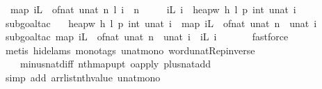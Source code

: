 \begin{isabellebody}
\ \ {\isacharparenleft}map\ {\isacharparenleft}iL\ {\isasymcirc}\ of{\isacharunderscore}nat{\isacharparenright}\ {\isacharbrackleft}{}{\isachardot}{\isachardot}{\isacharless}unat\ n{\isacharbrackright}{\isacharparenright}\ l{\isacharsemicolon}\ i\ {\isacharless}\ n{\isasymrbrakk}\ {\isasymLongrightarrow}\isanewline
\ \ \ \ iL\ i\ {\isacharequal}\ heap{\isacharunderscore}w{}{}\ h\ {\isacharparenleft}l\ {\isacharplus}\isactrlsub p\ int\ {\isacharparenleft}unat\ i{\isacharparenright}{\isacharparenright}{\isachardoublequoteclose}\ \isanewline
%
\isadelimproof
\ \ %
\endisadelimproof
%
\isatagproof
{}\isamarkupfalse%
\ {\isacharparenleft}subgoal{\isacharunderscore}tac\ \isanewline
\ \ {\isachardoublequoteopen}heap{\isacharunderscore}w{}{}\ h\ {\isacharparenleft}l\ {\isacharplus}\isactrlsub p\ int\ {\isacharparenleft}unat\ i{\isacharparenright}{\isacharparenright}\ {\isacharequal}\ map\ {\isacharparenleft}iL\ {\isasymcirc}\ of{\isacharunderscore}nat{\isacharparenright}\ {\isacharbrackleft}{}{\isachardot}{\isachardot}{\isacharless}unat\ n{\isacharbrackright}\ {\isacharbang}\ unat\ i{\isachardoublequoteclose}{\isacharparenright}\ \isanewline
\ \ \ \isamarkupfalse%
\ {\isacharparenleft}subgoal{\isacharunderscore}tac\ {\isachardoublequoteopen}map\ {\isacharparenleft}iL\ {\isasymcirc}\ of{\isacharunderscore}nat{\isacharparenright}\ {\isacharbrackleft}{}{\isachardot}{\isachardot}{\isacharless}unat\ n{\isacharbrackright}\ {\isacharbang}\ unat\ i\ {\isacharequal}\ iL\ i{\isachardoublequoteclose}{\isacharparenright}\ \isanewline
\ \ \ \ \isamarkupfalse%
\ fastforce\isanewline
\ \ \ \isamarkupfalse%
\ {\isacharparenleft}metis\ {\isacharparenleft}hide{\isacharunderscore}lams{\isacharcomma}\ mono{\isacharunderscore}tags{\isacharparenright}\ unat{\isacharunderscore}mono\ word{\isacharunderscore}unat{\isachardot}Rep{\isacharunderscore}inverse\ \isanewline
\ \ \ \ minus{\isacharunderscore}nat{\isachardot}diff{\isacharunderscore}{}\ nth{\isacharunderscore}map{\isacharunderscore}upt\ o{\isacharunderscore}apply\ plus{\isacharunderscore}nat{\isachardot}add{\isacharunderscore}{}{\isacharparenright}\isanewline
\ \ \isamarkupfalse%
\ {\isacharparenleft}simp\ add{\isacharcolon}\ arrlist{\isacharunderscore}nth{\isacharunderscore}value\ unat{\isacharunderscore}mono{\isacharparenright}\isanewline
\ \ \isamarkupfalse%
%
\endisatagproof
{\isafoldproof}%
%
\isadelimproof
\isanewline

\end{isabellebody}
